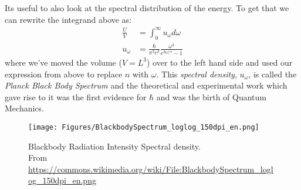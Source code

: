 Its useful to also look at the spectral distribution of the energy. To get that
we can rewrite the integrand above as:
\begin{align}
\frac{U}{V} &= \int_{0}^{\infty} u_{\omega} d\omega \\
u_{\omega}  &= \frac{\hbar}{\pi^2 c^3} \frac{\omega^3}{e^{\hbar \omega/\tau} - 1}
\label{eq:PlanckSpectralDensity}
\end{align}
where we've moved the volume ($V = L^3$) over to the left hand side and used
our expression from above to replace $n$ with $\omega$. This
\textit{spectral density}, $u_{\omega}$, is called the
\emph{Planck Black Body Spectrum} and the theoretical and experimental work which
gave rise to it was the first evidence for $\hbar$ and was the birth of
Quantum Mechanics.

\begin{figure}[ht]
\centering
\texttt{[image: Figures/BlackbodySpectrum\_loglog\_150dpi\_en.png]}
\caption{Blackbody Radiation Intensity Spectral density. \\
	From \url{https://commons.wikimedia.org/wiki/File:BlackbodySpectrum_loglog_150dpi_en.png}}
\end{figure}

